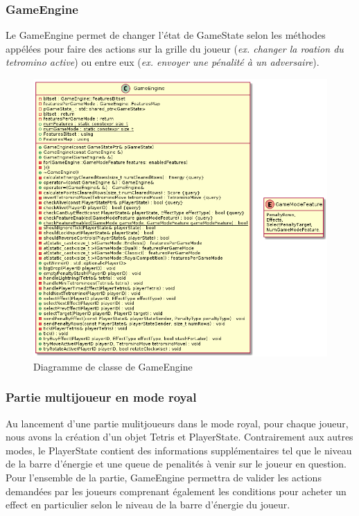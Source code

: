 \documentclass{article}
\begin{document}
\subsubsection*{GameEngine}

Le GameEngine permet de changer l'état de GameState selon les méthodes appélées pour faire des actions sur la grille du joueur (\textit{ex. changer la roation du tetromino active}) ou entre eux (\textit{ex. envoyer une pénalité à un adversaire}). 

\begin{figure}[!ht]
	\centering
	 \includegraphics[scale=0.3]{../res/uml/class/GameEngineClass.png}
	 \caption{Diagramme de classe de GameEngine}
	 \label{fig:main-menu}
\end{figure}

\subsubsection{Partie multijoueur en mode royal}

Au lancement d'une partie mulitjoueurs dans le mode royal, pour chaque joueur, nous avons la création d'un objet Tetris et PlayerState. Contrairement aux autres modes, le PlayerState contient des informations supplémentaires tel que le niveau de la barre d'énergie et une queue de penalités à venir sur le joueur en question. Pour l'ensemble de la partie, GameEngine permettra de valider les actions demandées par les joueurs comprenant également les conditions pour acheter un effect en particulier selon le niveau de la barre d'énergie du joueur. 
\end{document}
